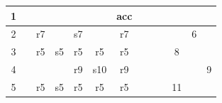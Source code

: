 \documentclass{article}
\begin{document}
\begin{latin}
\begin{table}[H]
\begin{tabular}{|ccccccccccccc|}
\multicolumn{1}{|c|}{{\color[HTML]{0000FF} 1}}         & \multicolumn{1}{c|}{}           & \multicolumn{1}{c|}{}           & \multicolumn{1}{c|}{}           & \multicolumn{1}{c|}{}           & \multicolumn{1}{c|}{}           & \multicolumn{1}{c|}{{\color[HTML]{008000} acc}} & \multicolumn{1}{c|}{}            & \multicolumn{1}{c|}{}                         & \multicolumn{1}{c|}{}                         & \multicolumn{1}{c|}{}                          & \multicolumn{1}{c|}{}                          &                          \\ \hline
\multicolumn{1}{|c|}{{\color[HTML]{0000FF} 2}}         & \multicolumn{1}{c|}{}           & \multicolumn{1}{c|}{r7}         & \multicolumn{1}{c|}{}           & \multicolumn{1}{c|}{s7}         & \multicolumn{1}{c|}{}           & \multicolumn{1}{c|}{r7}                         & \multicolumn{1}{c|}{}            & \multicolumn{1}{c|}{}                         & \multicolumn{1}{c|}{}                         & \multicolumn{1}{c|}{}                          & \multicolumn{1}{c|}{{\color[HTML]{0000FF} 6}}  &                          \\ \hline
\multicolumn{1}{|c|}{{\color[HTML]{0000FF} 3}}         & \multicolumn{1}{c|}{}           & \multicolumn{1}{c|}{r5}         & \multicolumn{1}{c|}{s5}         & \multicolumn{1}{c|}{r5}         & \multicolumn{1}{c|}{r5}         & \multicolumn{1}{c|}{r5}                         & \multicolumn{1}{c|}{}            & \multicolumn{1}{c|}{}                         & \multicolumn{1}{c|}{}                         & \multicolumn{1}{c|}{{\color[HTML]{0000FF} 8}}  & \multicolumn{1}{c|}{}                          &                          \\ \hline
\multicolumn{1}{|c|}{{\color[HTML]{0000FF} 4}}         & \multicolumn{1}{c|}{}           & \multicolumn{1}{c|}{}           & \multicolumn{1}{c|}{}           & \multicolumn{1}{c|}{r9}         & \multicolumn{1}{c|}{s10}        & \multicolumn{1}{c|}{r9}                         & \multicolumn{1}{c|}{}            & \multicolumn{1}{c|}{}                         & \multicolumn{1}{c|}{}                         & \multicolumn{1}{c|}{}                          & \multicolumn{1}{c|}{}                          & {\color[HTML]{0000FF} 9} \\ \hline
\multicolumn{1}{|c|}{{\color[HTML]{0000FF} 5}}         & \multicolumn{1}{c|}{}           & \multicolumn{1}{c|}{r5}         & \multicolumn{1}{c|}{s5}         & \multicolumn{1}{c|}{r5}         & \multicolumn{1}{c|}{r5}         & \multicolumn{1}{c|}{r5}                         & \multicolumn{1}{c|}{}            & \multicolumn{1}{c|}{}                         & \multicolumn{1}{c|}{}                         & \multicolumn{1}{c|}{{\color[HTML]{0000FF} 11}} & \multicolumn{1}{c|}{}                          &                          \\ \hline

\end{tabular}
\end{table}
\end{latin}
\end{document}
